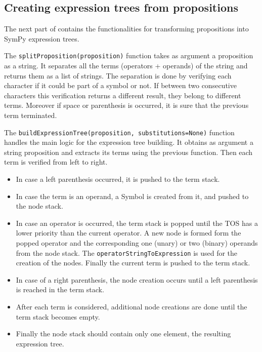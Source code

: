 \subsection{Creating expression trees from propositions}

The next part of  contains the functionalities for transforming propositions into SymPy expression trees.

The \verb|splitProposition(proposition)| function takes as argument a proposition as a string. It separates all the terms (operators + operands) of the string and returns them as a list of strings. The separation is done by verifying each character if it could be part of a symbol or not. If between two consecutive characters this verification returns a different result, they belong to different terms. Moreover if space or parenthesis is occurred, it is sure that the previous term terminated.

The \verb|buildExpressionTree(proposition, substitutions=None)| function handles the main logic for the expression tree building. It obtains as argument a string proposition and extracts its terms using the previous function. Then each term is verified from left to right. 

\begin{itemize}
\item In case a left parenthesis occurred, it is pushed to the term stack.

\item In case the term is an operand, a Symbol is created from it, and pushed to the node stack. 

\item In case an operator is occurred, the term stack is popped until the TOS has a lower priority than the current operator. A new node is formed form the popped operator and the corresponding one (unary) or two (binary) operands from the node stack. The \verb|operatorStringToExpression| is used for the creation of the nodes. Finally the current term is pushed to the term stack.

\item In case of a right parenthesis, the node creation occurs until a left parenthesis is reached in the term stack.

\item After each term is considered, additional node creations are done until the term stack becomes empty. 

\item Finally the node stack should contain only one element, the resulting expression tree.
\end{itemize}

